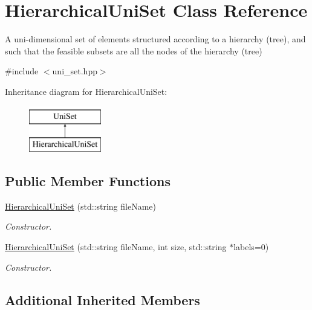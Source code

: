 \hypertarget{classHierarchicalUniSet}{\section{Hierarchical\-Uni\-Set Class Reference}
\label{classHierarchicalUniSet}
}


A uni-\/dimensional set of elements structured according to a hierarchy (tree), and such that the feasible subsets are all the nodes of the hierarchy (tree)  




{\ttfamily \#include $<$uni\-\_\-set.\-hpp$>$}

Inheritance diagram for Hierarchical\-Uni\-Set\-:\begin{figure}[H]
\begin{center}
\leavevmode
\includegraphics[height=2.000000cm]{classHierarchicalUniSet}
\end{center}
\end{figure}
\subsection*{Public Member Functions}
\begin{DoxyCompactItemize}
\item 
\hyperlink{classHierarchicalUniSet_aeb0f207ca4c762dcbf825b05a0839d6b}{Hierarchical\-Uni\-Set} (std\-::string file\-Name)
\begin{DoxyCompactList}\small\item\em Constructor. \end{DoxyCompactList}\item 
\hyperlink{classHierarchicalUniSet_ac5b9ec80cf2089ddb73cfabbac2407b4}{Hierarchical\-Uni\-Set} (std\-::string file\-Name, int size, std\-::string $\ast$labels=0)
\begin{DoxyCompactList}\small\item\em Constructor. \end{DoxyCompactList}\end{DoxyCompactItemize}
\subsection*{Additional Inherited Members}


